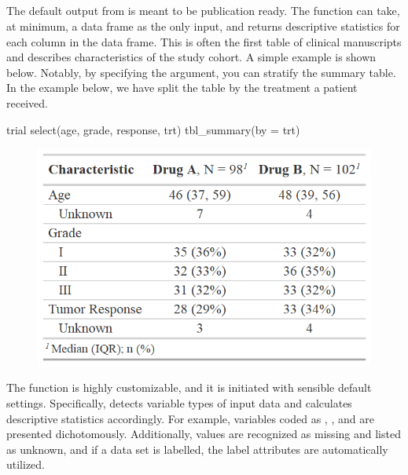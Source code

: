 \newpage


\subsection{\texorpdfstring{}{tbl\_summary()}}

The default output from  is meant to be publication ready.
The  function can take, at minimum, a data frame as the only input, and returns descriptive statistics for each column in the data frame.
This is often the first table of clinical manuscripts and describes characteristics of the study cohort.
A simple example is shown below.
Notably, by specifying the  argument, you can stratify the summary table. 
In the example below, we have split the table by the treatment a patient received. 

\begin{example}
trial %
  select(age, grade, response, trt) %
  tbl_summary(by = trt)
\end{example}
\begin{figure}[h!]
  \includegraphics[scale=0.49]{summary_basic.png}
  \centering
\end{figure}

The function is highly customizable, and it is initiated with sensible default settings.
Specifically,  detects variable types of input data and calculates descriptive statistics accordingly.
For example, variables coded as , , and  are presented dichotomously.
Additionally,  values are recognized as missing and listed as unknown, and if a data set is labelled, the label attributes are automatically utilized. 

